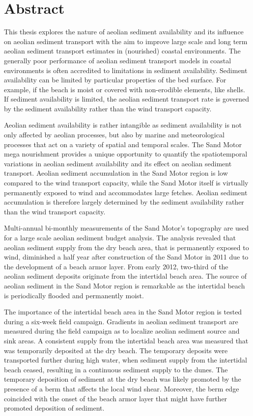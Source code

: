 \chapter*{Abstract}

This thesis explores the nature of aeolian sediment availability and
its influence on aeolian sediment transport with the aim to improve
large scale and long term aeolian sediment transport estimates in
(nourished) coastal environments. The generally poor performance of
aeolian sediment transport models in coastal environments is often
accredited to limitations in sediment availability. Sediment
availability can be limited by particular properties of the bed
surface. For example, if the beach is moist or covered with
non-erodible elements, like shells. If sediment availability is
limited, the aeolian sediment transport rate is governed by the
sediment availability rather than the wind transport capacity.

Aeolian sediment availability is rather intangible as sediment
availability is not only affected by aeolian processes, but also by
marine and meteorological processes that act on a variety of spatial
and temporal scales. The Sand Motor mega nourishment provides a unique
opportunity to quantify the spatiotemporal variations in aeolian
sediment availability and its effect on aeolian sediment
transport. Aeolian sediment accumulation in the Sand Motor region is
low compared to the wind transport capacity, while the Sand Motor
itself is virtually permanently exposed to wind and accommodates large
fetches. Aeolian sediment accumulation is therefore largely determined
by the sediment availability rather than the wind transport capacity.

Multi-annual bi-monthly measurements of the Sand Motor's topography
are used for a large scale aeolian sediment budget analysis. The
analysis revealed that aeolian sediment supply from the dry beach
area, that is permanently exposed to wind, diminished a half year
after construction of the Sand Motor in 2011 due to the development of
a beach armor layer. From early 2012, two-third of the aeolian
sediment deposits originate from the intertidal beach area. The source
of aeolian sediment in the Sand Motor region is remarkable as the
intertidal beach is periodically flooded and permanently moist.

The importance of the intertidal beach area in the Sand Motor region
is tested during a six-week field campaign. Gradients in aeolian
sediment transport are measured during the field campaign as to
localize aeolian sediment source and sink areas. A consistent supply
from the intertidal beach area was measured that was temporarily
deposited at the dry beach. The temporary deposits were transported
further during high water, when sediment supply from the intertidal
beach ceased, resulting in a continuous sediment supply to the
dunes. The temporary deposition of sediment at the dry beach was
likely promoted by the presence of a berm that affects the local wind
shear. Moreover, the berm edge coincided with the onset of the beach
armor layer that might have further promoted deposition of sediment.

